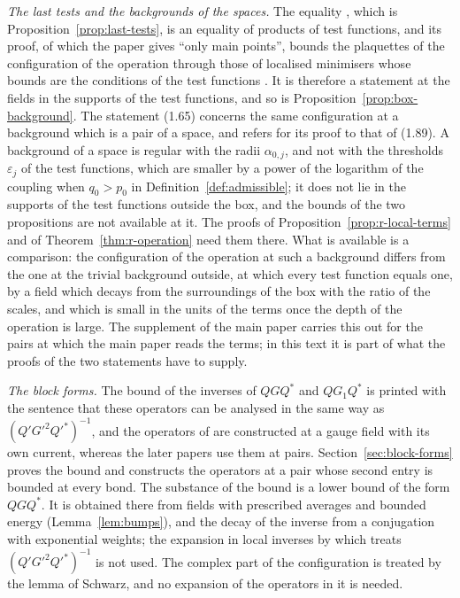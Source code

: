 \documentclass[11pt]{preprint}
\numberwithin{equation}{section}
\begin{document}
\emph{The last tests and the backgrounds of the spaces.} The equality \cite[(1.89), p.~198]{BalabanLFR1}, which is Proposition~\ref{prop:last-tests}, is an equality of products of test functions, and its proof, of which the paper gives ``only main points'', bounds the plaquettes of the configuration of the operation through those of localised minimisers whose bounds are the conditions of the test functions \cite[(1.88), (1.90)]{BalabanLFR1}. It is therefore a statement at the fields in the supports of the test functions, and so is Proposition~\ref{prop:box-background}. The statement (1.65) concerns the same configuration at a background which is a pair of a space, and \cite[p.~375]{BalabanLFR2} refers for its proof to that of (1.89). A background of a space is regular with the radii $\alpha_{0,j}$, and not with the thresholds $\varepsilon_j$ of the test functions, which are smaller by a power of the logarithm of the coupling when $q_0 > p_0$ in Definition~\ref{def:admissible}; it does not lie in the supports of the test functions outside the box, and the bounds of the two propositions are not available at it. The proofs of Proposition~\ref{prop:r-local-terms} and of Theorem~\ref{thm:r-operation} need them there. What is available is a comparison: the configuration of the operation at such a background differs from the one at the trivial background outside, at which every test function equals one, by a field which decays from the surroundings of the box with the ratio of the scales, and which is small in the units of the terms once the depth of the operation is large. The supplement of the main paper carries this out for the pairs at which the main paper reads the terms; in this text it is part of what the proofs of the two statements have to supply.

\emph{The block forms.} The bound \cite[(3.132), p.~422]{BalabanPBG} of the inverses of $QGQ^*$ and $QG_1Q^*$ is printed with the sentence that these operators can be analysed in the same way as $(Q'G'^2Q'^*)^{-1}$, and the operators of \cite[Sect.~D]{BalabanPBG} are constructed at a gauge field with its own current, whereas the later papers use them at pairs. Section~\ref{sec:block-forms} proves the bound and constructs the operators at a pair whose second entry is bounded at every bond. The substance of the bound is a lower bound of the form $QGQ^*$. It is obtained there from fields with prescribed averages and bounded energy (Lemma~\ref{lem:bumps}), and the decay of the inverse from a conjugation with exponential weights; the expansion in local inverses by which \cite{BalabanPRT2} treats $(Q'G'^2Q'^*)^{-1}$ is not used. The complex part of the configuration is treated by the lemma of Schwarz, and no expansion of the operators in it is needed.
\end{document}
